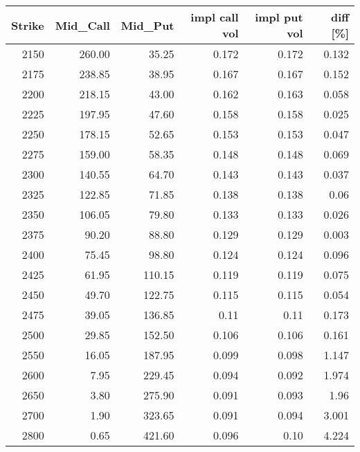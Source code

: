 \documentclass{article}
\begin{document}
\begin{tabular}{rrrrrr}
    \toprule
    Strike & Mid\_Call & Mid\_Put & impl call vol & impl put vol & diff [\%] \\
    \midrule
    2150   & 260.00    & 35.25    & 0.172         & 0.172        & 0.132     \\
    2175   & 238.85    & 38.95    & 0.167         & 0.167        & 0.152     \\
    2200   & 218.15    & 43.00    & 0.162         & 0.163        & 0.058     \\
    2225   & 197.95    & 47.60    & 0.158         & 0.158        & 0.025     \\
    2250   & 178.15    & 52.65    & 0.153         & 0.153        & 0.047     \\
    2275   & 159.00    & 58.35    & 0.148         & 0.148        & 0.069     \\
    2300   & 140.55    & 64.70    & 0.143         & 0.143        & 0.037     \\
    2325   & 122.85    & 71.85    & 0.138         & 0.138        & 0.06      \\
    2350   & 106.05    & 79.80    & 0.133         & 0.133        & 0.026     \\
    2375   & 90.20     & 88.80    & 0.129         & 0.129        & 0.003     \\
    2400   & 75.45     & 98.80    & 0.124         & 0.124        & 0.096     \\
    2425   & 61.95     & 110.15   & 0.119         & 0.119        & 0.075     \\
    2450   & 49.70     & 122.75   & 0.115         & 0.115        & 0.054     \\
    2475   & 39.05     & 136.85   & 0.11          & 0.11         & 0.173     \\
    2500   & 29.85     & 152.50   & 0.106         & 0.106        & 0.161     \\
    2550   & 16.05     & 187.95   & 0.099         & 0.098        & 1.147     \\
    2600   & 7.95      & 229.45   & 0.094         & 0.092        & 1.974     \\
    2650   & 3.80      & 275.90   & 0.091         & 0.093        & 1.96      \\
    2700   & 1.90      & 323.65   & 0.091         & 0.094        & 3.001     \\
    2800   & 0.65      & 421.60   & 0.096         & 0.10         & 4.224     \\
    \bottomrule
\end{tabular}
\end{document}
